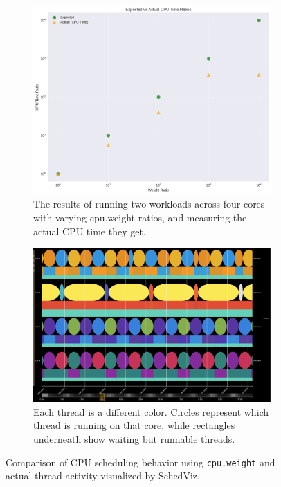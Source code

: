\begin{figure}[t]
    \centering
    \begin{subfigure}[t]{0.48\textwidth}
        \vspace{0pt}
        \centering
        \includegraphics[width=\textwidth]{graphs/cpu-weight_split.png}
        \caption{The results of running two workloads across four cores with varying
        cpu.weight ratios, and measuring the actual CPU time they get.}\label{fig:cpu-weight_split}
    \end{subfigure}
    \hfill
    \begin{subfigure}[t]{0.48\textwidth}
        \vspace{12pt}
        \centering
        \includegraphics[width=\textwidth]{graphs/cpu-split-schedviz.png}
        \vspace{5.5pt}
        \caption{Each thread is a different color. Circles represent which
        thread is running on that core, while rectangles underneath show waiting
        but runnable threads.}\label{fig:schedviz-split}
    \end{subfigure}
    \caption{Comparison of CPU scheduling behavior using \texttt{cpu.weight} and actual thread activity visualized by SchedViz.}
\end{figure}



